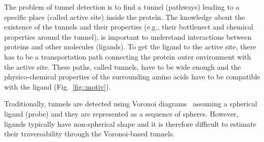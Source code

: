 \documentclass[letterpaper, 10 pt, conference]{ieeeconf} %
\begin{document}
The problem of tunnel detection is to find a tunnel (pathways) leading to a specific place (called active site) inside the protein.
The knowledge about the existence of the tunnels and their properties (e.g., their bottlenect and chemical properties around the tunnel),
is important to understand interactions between proteins and other molecules (ligands).
To get the ligand to the active site, there has to be a transportation path connecting the protein outer environment with the active site.
These paths, called tunnels, have to be wide enough and the physico-chemical properties of the surrounding amino acids have to be compatible with the ligand (Fig.~\ref{fig::motiv}).

Traditionally, tunnels are detected using Voronoi diagrams~\cite{yaffe2008,caver3} assuming 
a spherical ligand (probe) and they are represented as a sequence of spheres.
However, ligands typically have non-spherical shape and it is therefore difficult to estimate their traversability through
the Voronoi-based tunnels.

\end{document}
